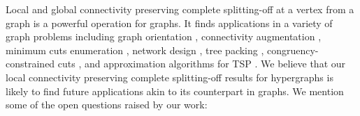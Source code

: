 Local and global connectivity preserving complete splitting-off at a vertex from a graph is a powerful operation for graphs. It finds applications in a variety of graph problems including graph orientation \cite{Mad78, Frank93:Applications-of-submod-functions, FK02, Kiraly-Lau}, connectivity augmentation \cite{Fra92, Fra94, JFJ95, Frank-book, nagamochi_ibaraki_2008_book}, 
minimum cuts enumeration \cite{NNI97, HW96, Goe01}, network design \cite{Lov76, Jor03, CS08, CFLY11}, tree packing \cite{BHTP03, Kri03, JMS03, Lau07}, congruency-constrained cuts \cite{NZ20}, and approximation algorithms for TSP \cite{GB93, BN23}. 
We believe that our local connectivity preserving complete splitting-off results for hypergraphs is likely to find future applications akin to its counterpart in graphs. 
We mention some of the open questions raised by our work:

